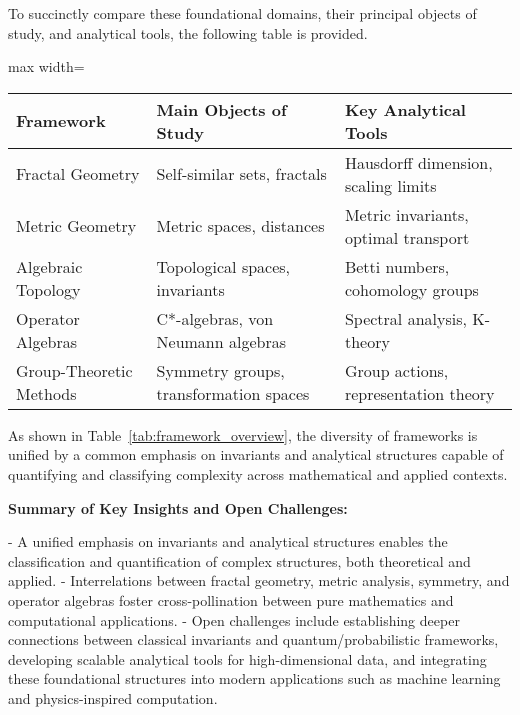 \documentclass[sigconf]{acmart}
\begin{document}
To succinctly compare these foundational domains, their principal objects of study, and analytical tools, the following table is provided.

\begin{table*}[htbp]
\centering
\caption{Principal Frameworks, Core Objects, and Key Analytical Tools}
\label{tab:framework_overview}
\begin{adjustbox}{max width=\textwidth}
\begin{tabular}{lll}
\toprule
\textbf{Framework}         & \textbf{Main Objects of Study}         & \textbf{Key Analytical Tools}             \\
\midrule
Fractal Geometry           & Self-similar sets, fractals            & Hausdorff dimension, scaling limits       \\
Metric Geometry            & Metric spaces, distances                & Metric invariants, optimal transport      \\
Algebraic Topology         & Topological spaces, invariants          & Betti numbers, cohomology groups          \\
Operator Algebras          & C*-algebras, von Neumann algebras       & Spectral analysis, K-theory               \\
Group-Theoretic Methods    & Symmetry groups, transformation spaces  & Group actions, representation theory      \\
\bottomrule
\end{tabular}
\end{adjustbox}
\end{table*}

As shown in Table~\ref{tab:framework_overview}, the diversity of frameworks is unified by a common emphasis on invariants and analytical structures capable of quantifying and classifying complexity across mathematical and applied contexts.

\textbf{Summary of Key Insights and Open Challenges:}

- A unified emphasis on invariants and analytical structures enables the classification and quantification of complex structures, both theoretical and applied.
- Interrelations between fractal geometry, metric analysis, symmetry, and operator algebras foster cross-pollination between pure mathematics and computational applications.
- Open challenges include establishing deeper connections between classical invariants and quantum/probabilistic frameworks, developing scalable analytical tools for high-dimensional data, and integrating these foundational structures into modern applications such as machine learning and physics-inspired computation.
\end{document}
